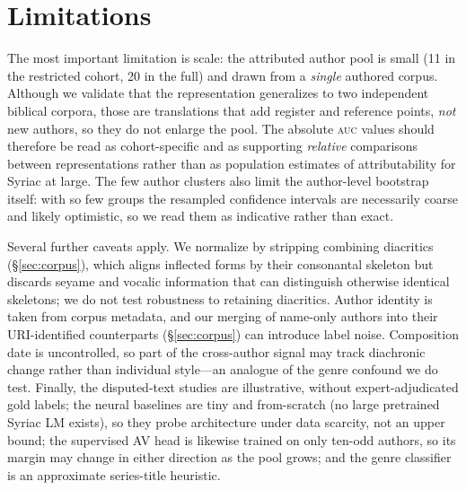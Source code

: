 \documentclass[11pt]{article}
\newcommand{\auc}{\textsc{auc}}
\newcommand{\auc}{\textsc{auc}}
\begin{document}
\section{Limitations}
\label{sec:limitations}
The most important limitation is scale: the attributed author pool is small
(11 in the restricted cohort, 20 in the full) and drawn from a \emph{single}
authored corpus.
Although we validate that the representation generalizes to two independent
biblical corpora, those are translations that add register and reference points,
\emph{not} new authors, so they do not enlarge the pool. The absolute \auc{}
values should therefore be read as cohort-specific and as supporting
\emph{relative} comparisons between representations rather than as population
estimates of attributability for Syriac at large. The few author clusters also
limit the author-level bootstrap itself: with so few groups the resampled
confidence intervals are necessarily coarse and likely optimistic, so we read them
as indicative rather than exact.

Several further caveats apply. We normalize by stripping combining diacritics
(\S\ref{sec:corpus}), which aligns inflected forms by their consonantal skeleton
but discards seyame and vocalic information that can distinguish otherwise
identical skeletons; we do not test robustness to retaining diacritics. Author
identity is taken from corpus metadata, and our merging of name-only authors into
their URI-identified counterparts (\S\ref{sec:corpus}) can introduce label noise.
Composition date is uncontrolled, so part of the cross-author signal may track
diachronic change rather than individual style---an analogue of the genre confound
we do test. Finally, the disputed-text studies are illustrative, without
expert-adjudicated gold labels; the neural baselines are tiny and from-scratch (no
large pretrained Syriac LM exists), so they probe architecture under data scarcity,
not an upper bound; the supervised AV head is likewise trained on only ten-odd
authors, so its margin may change in either direction as the pool grows; and the
genre classifier is an approximate series-title heuristic.

\end{document}

